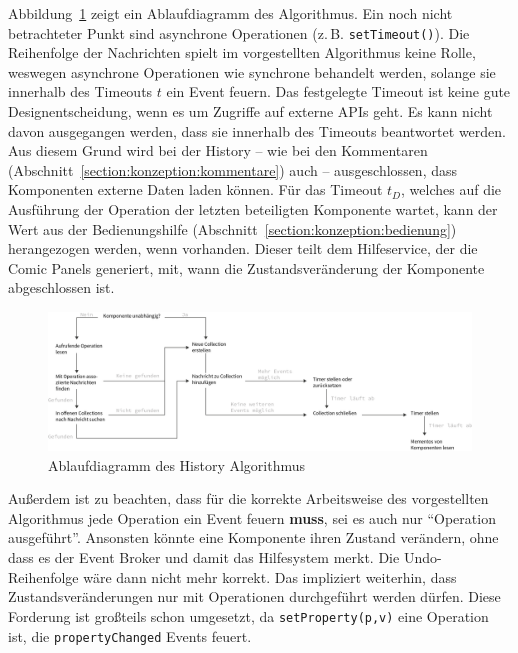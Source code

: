 \documentclass[
	headsepline,
	footsepline,
	fontsize=12pt,
	bibliography=totoc
]{scrbook}
\begin{document}
Abbildung~\ref{figure:dependency-graph-diagram} zeigt ein Ablaufdiagramm des Algorithmus. Ein noch nicht betrachteter Punkt sind asynchrone Operationen (z.\,B. \texttt{setTimeout()}). Die Reihenfolge der Nachrichten spielt im vorgestellten Algorithmus keine Rolle, weswegen asynchrone Operationen wie synchrone behandelt werden, solange sie innerhalb des Timeouts $t$ ein Event feuern. Das festgelegte Timeout ist keine gute Designentscheidung, wenn es um Zugriffe auf externe APIs geht. Es kann nicht davon ausgegangen werden, dass sie innerhalb des Timeouts beantwortet werden. Aus diesem Grund wird bei der History -- wie bei den Kommentaren (Abschnitt~\ref{section:konzeption:kommentare}) auch -- ausgeschlossen, dass Komponenten externe Daten laden können. Für das Timeout $t_D$, welches auf die Ausführung der Operation der letzten beteiligten Komponente wartet, kann der Wert aus der Bedienungshilfe (Abschnitt~\ref{section:konzeption:bedienung}) herangezogen werden, wenn vorhanden. Dieser teilt dem Hilfeservice, der die Comic Panels generiert, mit, wann die Zustandsveränderung der Komponente abgeschlossen ist.

\begin{figure}[htbp]
   \centering
   \includegraphics[width=\textwidth]{images/konzeption-dependency-graph-diagram.png}
   \caption{Ablaufdiagramm des History Algorithmus}
   \label{figure:dependency-graph-diagram}
\end{figure}

Außerdem ist zu beachten, dass für die korrekte Arbeitsweise des vorgestellten Algorithmus jede Operation ein Event feuern \textbf{muss}, sei es auch nur \enquote{Operation ausgeführt}. Ansonsten könnte eine Komponente ihren Zustand verändern, ohne dass es der Event Broker und damit das Hilfesystem merkt. Die Undo-Reihenfolge wäre dann nicht mehr korrekt. Das impliziert weiterhin, dass Zustandsveränderungen nur mit Operationen durchgeführt werden dürfen. Diese Forderung ist großteils schon umgesetzt, da \texttt{setProperty(p,v)} eine Operation ist, die \texttt{propertyChanged} Events feuert.
\end{document}
